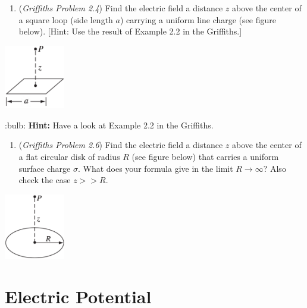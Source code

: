 \documentclass[
  letterpaper,
  DIV=11,
  numbers=noendperiod]{scrreprt}
\providecommand{\tightlist}{%
  \setlength{\itemsep}{0pt}\setlength{\parskip}{0pt}}\usepackage{longtable,booktabs,array}
\begin{document}
\begin{enumerate}
\def\labelenumi{\arabic{enumi})}
\setcounter{enumi}{2}
\tightlist
\item
  (\emph{Griffiths Problem 2.4}) Find the electric field a distance
  \(z\) above the center of a square loop (side length \(a\)) carrying a
  uniform line charge (see figure below). {[}Hint: Use the result of
  Example 2.2 in the Griffiths.{]}
\end{enumerate}

\includegraphics[width=1.04167in,height=\textheight]{Figures/L1_prob3.png}

:bulb: \textbf{Hint:} Have a look at Example 2.2 in the Griffiths.

\begin{enumerate}
\def\labelenumi{\arabic{enumi})}
\setcounter{enumi}{3}
\tightlist
\item
  (\emph{Griffiths Problem 2.6}) Find the electric field a distance
  \(z\) above the center of a flat circular disk of radius \(R\) (see
  figure below) that carries a uniform surface charge \(\sigma\). What
  does your formula give in the limit \(R \rightarrow \infty\)? Also
  check the case \(z >> R\).
\end{enumerate}

\includegraphics[width=1.04167in,height=\textheight]{Figures/L1_prob4.png}


\chapter{Electric Potential}\label{electric-potential}

\newcommand{\l}{\mathrm{\mathbf{l}}}
\newcommand{\E}{\mathrm{\mathbf{E}}}
\newcommand{\F}{\mathrm{\mathbf{F}}}
\newcommand{\r}{\mathrm{\mathbf{r}}}

\newcommand{\x}{\mathrm{\mathbf{x}}}
\newcommand{\y}{\mathrm{\mathbf{y}}}
\newcommand{\z}{\mathrm{\mathbf{z}}}
\end{document}
